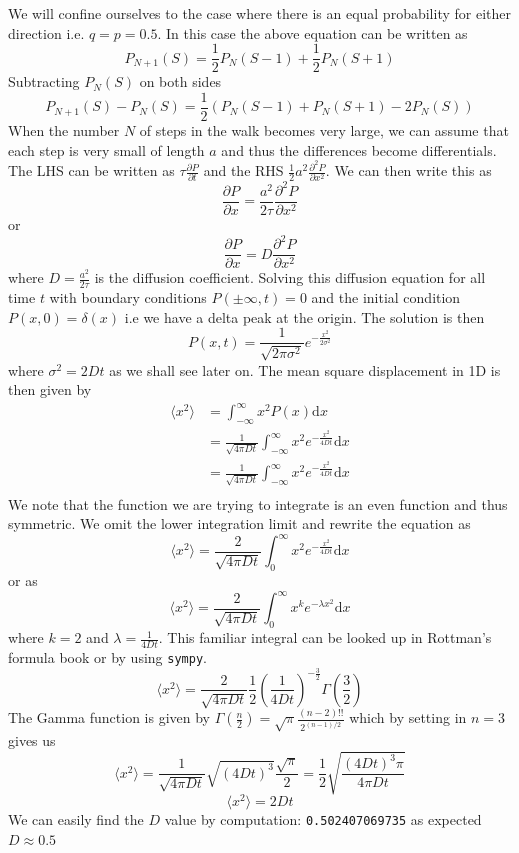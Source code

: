 \documentclass{article}
\begin{document}
\begin{enumerate}[I]
We will confine ourselves to the case where there is an equal probability for either direction i.e. $q=p=0.5$. In this case the above equation can be written as 
\[P_{N+1}(S)=\frac{1}{2}P_{N}(S-1)+\frac{1}{2}P_{N}(S+1)\]
Subtracting $P_{N}(S)$ on both sides
\[P_{N+1}(S)-P_{N}(S)=\frac{1}{2}\left(P_{N}(S-1)+P_{N}(S+1)-2P_{N}(S)\right)\]
When the number $N$ of steps in the walk becomes very large, we can assume that each step is very small of length $a$ and thus the differences become differentials.
The LHS can be written as $\tau \frac{\partial P}{\partial t}$ and the RHS $\frac{1}{2}a^2 \frac{\partial^2 P}{\partial x^2}$. We can then write this as 
\[\frac{\partial P}{\partial x}=\frac{a^2}{2\tau} \frac{\partial^2 P}{\partial x^2}\]
or
\[\frac{\partial P}{\partial x}=D \frac{\partial^2 P}{\partial x^2}\]
where $D=\frac{a^2}{2\tau}$ is the diffusion coefficient. Solving this diffusion equation for all time $t$ with boundary conditions $P(\pm\infty,t)=0$ and the initial condition $P(x,0) = \delta(x)$ i.e we have a delta peak at the origin. The solution is then
\[P(x,t) = \frac{1}{\sqrt{2\pi\sigma^2}}e^{-\frac{x^2}{2\sigma^2}}\]
where $\sigma^2 = 2Dt$ as we shall see later on. The mean square displacement in 1D is then given by 
\begin{align*}  
\langle x^2 \rangle &= \int_{-\infty}^{\infty} x^2P(x)\mathrm{d}x\\
 &= \frac{1}{\sqrt{4\pi Dt}}\int_{-\infty}^{\infty} x^2 e^{-\frac{x^2}{4Dt}}\mathrm{d}x\\
 &= \frac{1}{\sqrt{4\pi Dt}}\int_{-\infty}^{\infty} x^2 e^{-\frac{x^2}{4Dt}}\mathrm{d}x\\
\end{align*}
We note that the function we are trying to integrate is an even function and thus symmetric. We omit the lower integration limit and rewrite the equation as
\[\langle x^2 \rangle = \frac{2}{\sqrt{4\pi Dt}}\int_{0}^{\infty} x^2 e^{-\frac{x^2}{4Dt}}\mathrm{d}x\]
or as
\[\langle x^2 \rangle = \frac{2}{\sqrt{4\pi Dt}}\int_{0}^{\infty} x^k e^{-\lambda x^2} \mathrm{d}x\]
where $k=2$ and $\lambda = \frac{1}{4Dt}$. This familiar integral can be looked up in Rottman's formula book or by using \texttt{sympy}. 
\[\langle x^2 \rangle = \frac{2}{\sqrt{4\pi Dt}}\frac{1}{2}\left(\frac{1}{4Dt}\right)^{-\frac{3}{2}}\Gamma\left(\frac{3}{2}\right) \] 
The Gamma function is given by $\Gamma\left(\frac{n}{2}\right) = \sqrt{\pi}\frac{(n-2)!!}{2^{(n-1)/2}}$ which by setting in $n=3$ gives us
\[\langle x^2 \rangle = \frac{1}{\sqrt{4\pi Dt}}\sqrt{(4Dt)^3}\frac{\sqrt\pi}{2} = \frac{1}{2}\sqrt{\frac{(4Dt)^3 \pi}{4\pi Dt}}\]
\[\langle x^2 \rangle = 2Dt\]
We can easily find the $D$ value by computation:
\texttt{0.502407069735}
as expected $D\approx 0.5$\\


\end{enumerate}
\end{document}
